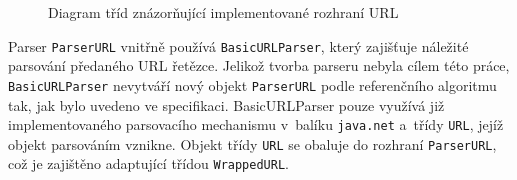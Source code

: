 \begin{figure}[H]
  \begin{center}
    \caption{Diagram tříd znázorňující implementované rozhraní URL}
    \label{Figure.URLInterface}
  \end{center}
\end{figure}

Parser \texttt{ParserURL} vnitřně používá \texttt{BasicURLParser}, který zajišťuje náležité parsování předaného URL řetězce. Jelikož tvorba parseru nebyla cílem této práce, \texttt{BasicURLParser} nevytváří nový objekt \texttt{ParserURL} podle referenčního algoritmu tak, jak bylo uvedeno ve specifikaci. BasicURLParser pouze využívá již implementovaného parsovacího mechanismu v~balíku \texttt{java.net} a~třídy \texttt{URL}, jejíž objekt parsováním vznikne. Objekt třídy \texttt{URL} se obaluje do rozhraní \texttt{ParserURL}, což je zajištěno adaptující třídou \texttt{WrappedURL}.

